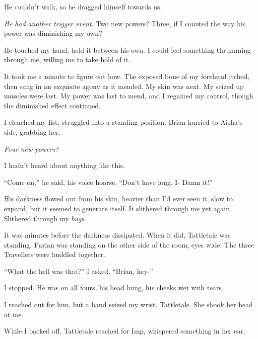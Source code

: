 He couldn't walk, so he dragged himself towards us.



\emph{He had another trigger event}.  Two new powers?  Three, if I counted the way his power was diminishing my own?



He touched my hand, held it between his own.  I could feel something thrumming through me, willing me to take hold of it.



It took me a minute to figure out how.  The exposed bone of my forehead itched, then sang in an exquisite agony as it mended.  My skin was next.  My seized up muscles were last.  My power was last to mend, and I regained my control, though the diminished effect continued.



I clenched my fist, struggled into a standing position.  Brian hurried to Aisha's side, grabbing her.



\emph{Four new powers?}



I hadn't heard about anything like this.



``Come on,'' he said, his voice hoarse, ``Don't have long.  I-  Damn it!''



His darkness flowed out from his skin, heavier than I'd ever seen it, slow to expand, but it seemed to generate itself.  It slithered through me yet again.  Slithered through my \emph{bugs}.



It was minutes before the darkness dissipated.  When it did, Tattletale was standing.  Parian was standing on the other side of the room, eyes wide.  The three Travellers were huddled together.



``What the hell was that?'' I asked.  ``Brian, hey-''



I stopped.  He was on all fours, his head hung, his cheeks wet with tears.



I reached out for him, but a hand seized my wrist.  Tattletale.  She shook her head at me.



While I backed off, Tattletale reached for Imp, whispered something in her ear.



